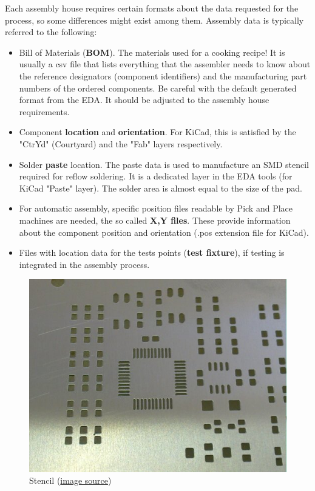 \documentclass[final]{cubedoc}
\begin{document}
	Each assembly house requires certain formats about the data requested for the process, so some differences might exist among them. Assembly data is typically referred to the following:
	
	\begin{itemize}	
		\item Bill of Materials (\textbf{BOM}). The materials used for a cooking recipe! It is usually a csv file that lists everything that the assembler needs to know about the reference designators (component identifiers) and the manufacturing part numbers of the ordered components. Be careful with the default generated format from the EDA. It should be adjusted to the assembly house requirements.
		\item Component \textbf{location} and \textbf{orientation}. For KiCad, this is satisfied by the "CtrYd" (Courtyard) and the "Fab" layers respectively.
		\item Solder \textbf{paste} location. The paste data is used to manufacture an SMD stencil required for reflow soldering. It is a dedicated layer in the EDA tools (for KiCad "Paste" layer). The solder area is almost equal to the size of the pad.
		\item For automatic assembly, specific position files readable by Pick and Place machines are needed, the so called \textbf{X,Y files}. These provide information about the component position and orientation (.pos extension file for KiCad).
		\item Files with location data for the tests points (\textbf{test fixture}), if testing is integrated in the assembly process.
	\end{itemize}
	
	
	\begin{figure}[h!]
		\centering
		\includegraphics[keepaspectratio, height = 0.25\textheight, width = \textwidth]{assets/solder_paste_stencil.jpg}
		\caption{Stencil \small{(\href{https://web.archive.org/web/20200814091107/https://www.itmconsulting.com/?product=stencilpro-3-0-stencil-aperture-calculator}{image source})}}
	\end{figure}
	
\end{document}
